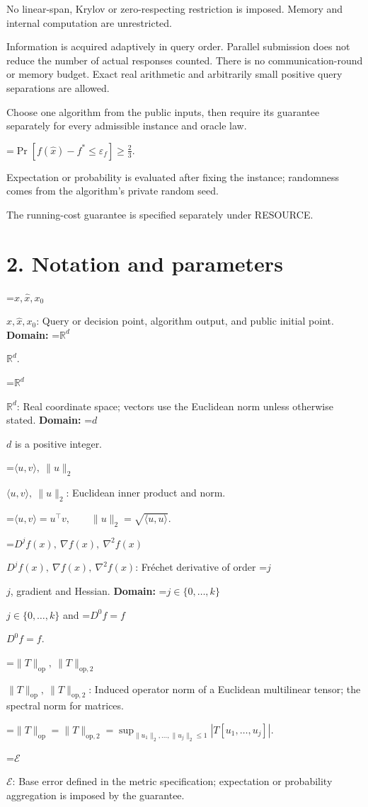 \documentclass[10pt,a4paper]{article}
\newcommand{\AtlasMath}[1]{\par\begingroup\centering\setbox0=\hbox{$\displaystyle #1$}\ifdim\wd0>1.4\linewidth\typeout{ATLAS WIDE FORMULA: \the\wd0}\fi\ifdim\wd0>\linewidth\resizebox{\linewidth}{!}{\box0}\else\box0\fi\par\endgroup}
\newcommand{\AtlasInlineMath}[1]{\begingroup\setbox0=\hbox{$#1$}\ifdim\wd0>.4\linewidth\endgroup\AtlasMath{#1}\else\endgroup$#1$\fi}
\begin{document}
No linear-span, Krylov or zero-respecting restriction is imposed. Memory and internal computation are unrestricted.

Information is acquired adaptively in query order. Parallel submission does not reduce the number of actual responses counted. There is no communication-round or memory budget. Exact real arithmetic and arbitrarily small positive query separations are allowed.

Choose one algorithm from the public inputs, then require its guarantee separately for every admissible instance and oracle law.


\AtlasMath{\Pr\!\left[f(\widehat{x})-f^*\le \varepsilon_f\right]\ge\frac23.}


Expectation or probability is evaluated after fixing the instance; randomness comes from the algorithm's private random seed.

The running-cost guarantee is specified separately under RESOURCE.

\section{2. Notation and parameters}
\AtlasInlineMath{x,\widehat{x},x_0}: Query or decision point, algorithm output, and public initial point. \textbf{Domain:} \AtlasInlineMath{\mathbb{R}^d}.

\AtlasInlineMath{\mathbb{R}^d}: Real coordinate space; vectors use the Euclidean norm unless otherwise stated. \textbf{Domain:} \AtlasInlineMath{d} is a positive integer.

\AtlasInlineMath{\langle u,v\rangle,\ \|u\|_2}: Euclidean inner product and norm.


\AtlasMath{\langle u,v\rangle=u^\top v,\qquad\|u\|_2=\sqrt{\langle u,u\rangle}.}


\AtlasInlineMath{D^jf(x),\ \nabla f(x),\ \nabla^2f(x)}: Fréchet derivative of order \AtlasInlineMath{j}, gradient and Hessian. \textbf{Domain:} \AtlasInlineMath{j\in\{0,\ldots,k\}} and \AtlasInlineMath{D^0f=f}.

\AtlasInlineMath{\|T\|_{\mathrm{op}},\ \|T\|_{\mathrm{op},2}}: Induced operator norm of a Euclidean multilinear tensor; the spectral norm for matrices.


\AtlasMath{\|T\|_{\mathrm{op}}=\|T\|_{\mathrm{op},2}=\sup_{\|u_1\|_2,\ldots,\|u_j\|_2\le1}|T[u_1,\ldots,u_j]|.}


\AtlasInlineMath{\mathcal{E}}: Base error defined in the metric specification; expectation or probability aggregation is imposed by the guarantee.
\end{document}
